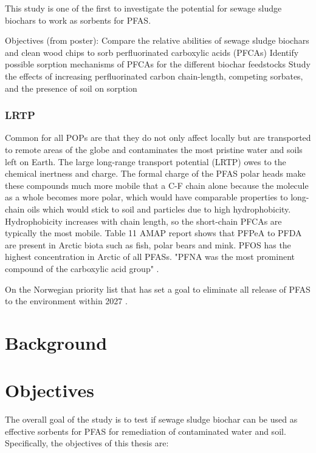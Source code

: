 This study is one of the first to investigate the potential for sewage sludge biochars to work as sorbents for PFAS.

Objectives (from poster):
Compare the relative abilities of sewage sludge biochars and clean wood chips to sorb perfluorinated carboxylic acids (PFCAs)
Identify possible sorption mechanisms of PFCAs for the different biochar feedstocks
Study the effects of increasing perfluorinated carbon chain-length, competing sorbates, and the presence of soil on sorption

\subsubsection{LRTP}
Common for all POPs are that they do not only affect locally but are transported to remote areas of the globe and contaminates the most pristine water and soils left on Earth. The large long-range transport potential (LRTP) owes to the chemical inertness and charge. The formal charge of the PFAS polar heads make these compounds much more mobile that a C-F chain alone because the molecule as a whole becomes more polar, which would have comparable properties to long-chain oils which would stick to soil and particles due to high hydrophobicity. Hydrophobicity increases with chain length, so the short-chain PFCAs are typically the most mobile. Table 11 AMAP report shows that PFPeA to PFDA are present in Arctic biota such as fish, polar bears and mink. PFOS has the highest concentration in Arctic of all PFASs. "PFNA was the most prominent compound of the carboxylic acid group" \citep{Schlabach2017}.

On the Norwegian priority list that has set a goal to eliminate all release of PFAS to the environment within 2027 \citep{MD2016workshop}.
\section{Background}\label{sec:Background}
 

\section{Objectives}
The overall goal of the study is to test if sewage sludge biochar can be used as effective sorbents for PFAS for remediation of contaminated water and soil. Specifically, the objectives of this thesis are:

